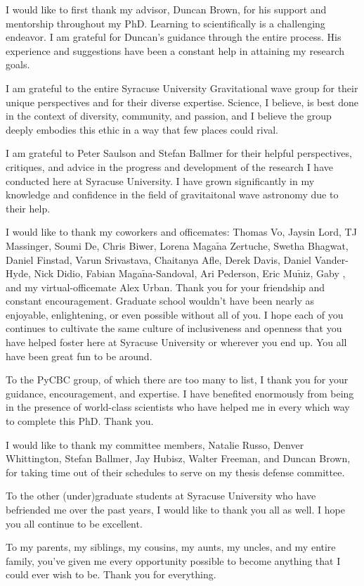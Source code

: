 I would like to first thank my advisor, Duncan Brown, for his support and mentorship throughout my PhD. Learning
to scientifically is a challenging endeavor. I am grateful for Duncan's guidance through
the entire process. His experience and suggestions have been a constant help in attaining my research goals.

I am grateful to the entire Syracuse University Gravitational wave group for their unique perspectives and for their
diverse expertise. Science, I believe, is best done in the context of diversity, community, and passion, and I believe
the group deeply embodies this ethic in a way that few places could rival.

I am grateful to Peter Saulson and Stefan Ballmer for their helpful perspectives, critiques, and advice in the
progress and development of the research I have conducted here at Syracuse University. I
have grown significantly in my knowledge and confidence in the field of
gravitaitonal wave astronomy due to their help.

I would like to thank my coworkers and officemates: Thomas Vo, Jaysin Lord, TJ Massinger, Soumi De, Chris Biwer,
Lorena Maga$\tilde{\text{n}}$a Zertuche, Swetha Bhagwat, Daniel Finstad, Varun Srivastava,
Chaitanya Afle, Derek Davis, Daniel Vander-Hyde, Nick Didio,
Fabian Maga$\tilde{\text{n}}$a-Sandoval, Ari Pederson, Eric Mu$\tilde{\text{n}}$iz, Gaby , and my virtual-officemate Alex Urban.
Thank you for your friendship and constant encouragement.
Graduate school wouldn't have been nearly as enjoyable, enlightening, or even possible without all of you.
I hope each of you continues to
cultivate the same culture of inclusiveness and openness that you have helped foster here at Syracuse University
or wherever you end up. You all have been great fun to be around.

To the PyCBC group, of which there are too many to list, I thank you for your guidance, encouragement, and
expertise. I have benefited enormously from being in the presence of world-class scientists who have helped
me in every which way to complete this PhD. Thank you. 

I would like to thank my committee members, Natalie Russo, Denver Whittington, Stefan Ballmer, Jay Hubisz, Walter Freeman, 
and Duncan Brown, for taking time out of their schedules to serve on my thesis defense committee.

To the other (under)graduate students at Syracuse University who have befriended me over the past years, I would
like to thank you all as well. I hope you all continue to be excellent. 

To my parents, my siblings, my cousins, my aunts, my uncles, and my entire family, you've given me every opportunity
possible to become anything that I could ever wish to be. Thank you for everything.
